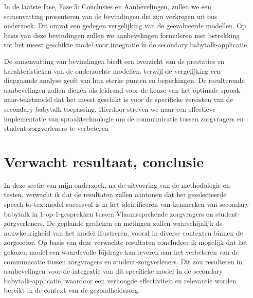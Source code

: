 In de laatste fase, Fase 5: Conclusies en Aanbevelingen, zullen we een samenvatting presenteren van de bevindingen die zijn verkregen uit ons onderzoek. Dit omvat een gedegen vergelijking van de geëvalueerde modellen. Op basis van deze bevindingen zullen we aanbevelingen formuleren met betrekking tot het meest geschikte model voor integratie in de secondary babytalk-applicatie.

De samenvatting van bevindingen biedt een overzicht van de prestaties en karakteristieken van de onderzochte modellen, terwijl de vergelijking een diepgaande analyse geeft van hun sterke punten en beperkingen. De resulterende aanbevelingen zullen dienen als leidraad voor de keuze van het optimale spraak-naar-tekstmodel dat het meest geschikt is voor de specifieke vereisten van de secondary babytalk-toepassing. Hierdoor streven we naar een effectieve implementatie van spraaktechnologie om de communicatie tussen zorgvragers en student-zorgverleners te verbeteren
\section{Verwacht resultaat, conclusie}%
\label{sec:verwachte_resultaten}
In deze sectie van mijn onderzoek, na de uitvoering van de methodologie en testen, verwacht ik dat de resultaten zullen aantonen dat het geselecteerde speech-to-textmodel succesvol is in het identificeren van kenmerken van secondary babytalk in 1-op-1-gesprekken tussen Vlaamssprekende zorgvragers en student-zorgverleners. De geplande grafieken en metingen zullen waarschijnlijk de nauwkeurigheid van het model illustreren, vooral in diverse contexten binnen de zorgsector. Op basis van deze verwachte resultaten concludeer ik mogelijk dat het gekozen model een waardevolle bijdrage kan leveren aan het verbeteren van de communicatie tussen zorgvragers en student-zorgverleners. Dit zou resulteren in aanbevelingen voor de integratie van dit specifieke model in de secondary babytalk-applicatie, waardoor een verhoogde effectiviteit en relevantie worden bereikt in de context van de gezondheidszorg.

